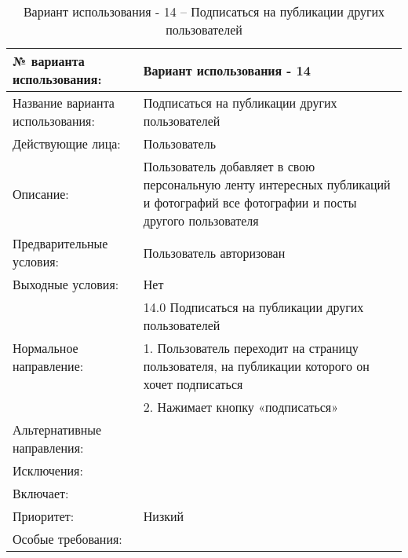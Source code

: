 \begin{table}[H]
  \caption{Вариант использования - 14 – Подписаться на публикации других пользователей}\label{use-case-14-table}
  \begin{tabular}{|p{6cm}|p{10cm}|}
  \hline № варианта использования: & Вариант использования - 14 \\
  \hline Название варианта использования: & Подписаться на публикации других пользователей \\
  \hline Действующие лица: & Пользователь \\
  \hline Описание: & Пользователь добавляет в свою персональную ленту интересных публикаций и фотографий все фотографии и посты другого пользователя \\
  \hline Предварительные условия: & Пользователь авторизован \\
  \hline Выходные условия: & Нет \\
  \hline \multirow{3}{*}{Нормальное направление:} & 14.0 Подписаться на публикации других пользователей \\
  \cline{2-2} & 1. Пользователь переходит на страницу пользователя, на публикации которого он хочет подписаться \\
  \cline{2-2} & 2. Нажимает кнопку «подписаться» \\
  \hline Альтернативные направления: &  \\
  \hline Исключения: &  \\
  \hline Включает: &  \\
  \hline Приоритет: & Низкий \\
  \hline Особые требования: &  \\
  \hline 
  \end{tabular}
\end{table}

